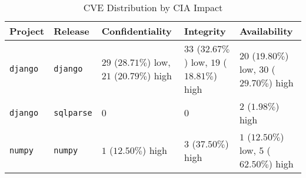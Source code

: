 \begin{table}
\caption{CVE Distribution by CIA Impact}
\label{tab:cve-cia-distribution}
\begin{tabular}{lllll}
\toprule
Project & Release & Confidentiality & Integrity & Availability \\
\midrule
\texttt{django} & \texttt{django} & $29$ ($28.71\%$) low, $21$ ($20.79\%$) high & $33$ ($32.67\%$) low, $19$ ($18.81\%$) high & $20$ ($19.80\%$) low, $30$ ($29.70\%$) high \\
\texttt{django} & \texttt{sqlparse} & $0$ & $0$ & $2$ ($1.98\%$) high \\
\texttt{numpy} & \texttt{numpy} & $1$ ($12.50\%$) high & $3$ ($37.50\%$) high & $1$ ($12.50\%$) low, $5$ ($62.50\%$) high \\
\bottomrule
\end{tabular}
\end{table}
